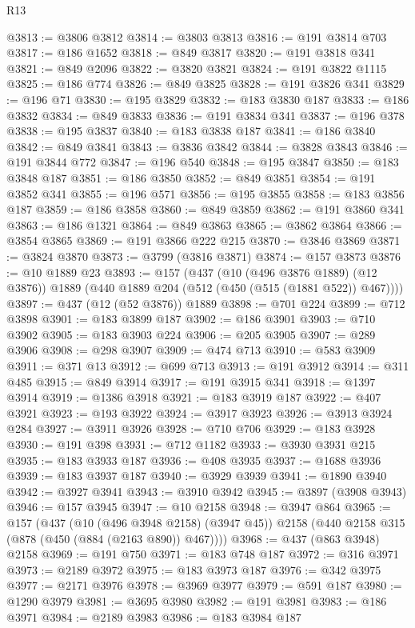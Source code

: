 \begin{lexlean}{R13}
\begin{coremodule}
@3813 := @3806 @3812
@3814 := @3803 @3813
@3816 := @191 @3814 @703
@3817 := @186 @1652
@3818 := @849 @3817
@3820 := @191 @3818 @341
@3821 := @849 @2096
@3822 := @3820 @3821
@3824 := @191 @3822 @1115
@3825 := @186 @774
@3826 := @849 @3825
@3828 := @191 @3826 @341
@3829 := @196 @71
@3830 := @195 @3829
@3832 := @183 @3830 @187
@3833 := @186 @3832
@3834 := @849 @3833
@3836 := @191 @3834 @341
@3837 := @196 @378
@3838 := @195 @3837
@3840 := @183 @3838 @187
@3841 := @186 @3840
@3842 := @849 @3841
@3843 := @3836 @3842
@3844 := @3828 @3843
@3846 := @191 @3844 @772
@3847 := @196 @540
@3848 := @195 @3847
@3850 := @183 @3848 @187
@3851 := @186 @3850
@3852 := @849 @3851
@3854 := @191 @3852 @341
@3855 := @196 @571
@3856 := @195 @3855
@3858 := @183 @3856 @187
@3859 := @186 @3858
@3860 := @849 @3859
@3862 := @191 @3860 @341
@3863 := @186 @1321
@3864 := @849 @3863
@3865 := @3862 @3864
@3866 := @3854 @3865
@3869 := @191 @3866 @222 @215
@3870 := @3846 @3869
@3871 := @3824 @3870
@3873 := @3799 (@3816 @3871)
@3874 := @157 @3873
@3876 := @10 @1889 @23
@3893 := @157
    (@437
      (@10 (@496 @3876 @1889) (@12 @3876))
      @1889
      (@440 @1889 @204 (@512 (@450 (@515 (@1881 @522)) @467))))
@3897 := @437 (@12 (@52 @3876)) @1889
@3898 := @701 @224
@3899 := @712 @3898
@3901 := @183 @3899 @187
@3902 := @186 @3901
@3903 := @710 @3902
@3905 := @183 @3903 @224
@3906 := @205 @3905
@3907 := @289 @3906
@3908 := @298 @3907
@3909 := @474 @713
@3910 := @583 @3909
@3911 := @371 @13
@3912 := @699 @713
@3913 := @191 @3912
@3914 := @311 @485
@3915 := @849 @3914
@3917 := @191 @3915 @341
@3918 := @1397 @3914
@3919 := @1386 @3918
@3921 := @183 @3919 @187
@3922 := @407 @3921
@3923 := @193 @3922
@3924 := @3917 @3923
@3926 := @3913 @3924 @284
@3927 := @3911 @3926
@3928 := @710 @706
@3929 := @183 @3928
@3930 := @191 @398
@3931 := @712 @1182
@3933 := @3930 @3931 @215
@3935 := @183 @3933 @187
@3936 := @408 @3935
@3937 := @1688 @3936
@3939 := @183 @3937 @187
@3940 := @3929 @3939
@3941 := @1890 @3940
@3942 := @3927 @3941
@3943 := @3910 @3942
@3945 := @3897 (@3908 @3943)
@3946 := @157 @3945
@3947 := @10 @2158
@3948 := @3947 @864
@3965 := @157
    (@437
      (@10 (@496 @3948 @2158) (@3947 @45))
      @2158
      (@440 @2158 @315 (@878 (@450 (@884 (@2163 @890)) @467))))
@3968 := @437 (@863 @3948) @2158
@3969 := @191 @750
@3971 := @183 @748 @187
@3972 := @316 @3971
@3973 := @2189 @3972
@3975 := @183 @3973 @187
@3976 := @342 @3975
@3977 := @2171 @3976
@3978 := @3969 @3977
@3979 := @591 @187
@3980 := @1290 @3979
@3981 := @3695 @3980
@3982 := @191 @3981
@3983 := @186 @3971
@3984 := @2189 @3983
@3986 := @183 @3984 @187

\end{coremodule}
\end{lexlean}
